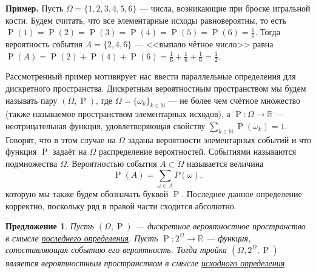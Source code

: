 \documentclass[12pt]{article}
\newtheorem{proposition}[theorem]{Предложение}
\numberwithin{theorem}{section}
\theoremstyle{definition}
\newenvironment{example}{\indent \textbf{Пример.}}{\indent}
\newcommand{\defin}[2]{\hypertarget{#2}{{\color{red} #1}}}
\newcommand{\RR}{\mathbb{R}}
\newcommand{\prob}{\operatorname{P}}
\begin{document}
	\begin{example}
		Пусть $ \Omega = \{1,2,3,4,5,6\} $ --- числа, возникающие при броске игральной кости.
		Будем считать, что все элементарные исходы равновероятны, 
		то есть $ \prob(1) = \prob(2) = \prob(3) = \prob(4) = \prob(5) = \prob(6) = \tfrac{1}{6} $.
		Тогда вероятность события $ A = \{2,4,6\} $ --- <<выпало чётное число>> 
		равна $ \prob(A) = \prob(2) + \prob(4) + \prob(6) = \tfrac{1}{6} + \tfrac{1}{6} + \tfrac{1}{6} = \tfrac{1}{2} $.
	\end{example}
	
	Рассмотренный пример мотивирует нас ввести параллельные определения для дискретного пространства.
	\defin{Дискретным вероятностным пространством}{discr-2} мы будем называть  пару $ (\Omega, \prob) $, 
	где $ \Omega = \{\omega_k\}_{k \in \mathbb{N}} $ --- не более чем счётное множество 
	(также называемое \defin{пространством элементарных исходов}{space-discr}),
	а $ \prob \colon \Omega \to \RR $ --- неотрицательная функция, удовлетворяющая свойству
	$ \sum\limits_{k \in \mathbb{N}} \prob(\omega_k) = 1 $.	
	Говорят, что в этом случае на $ \Omega $ \defin{заданы вероятности элементарных событий}{prob-defined} и что функция $ \prob $ 
	\defin{задаёт на $ \Omega $ распределение вероятностей}{disrtib-discr}.
	\defin{Событиями}{event-discr} называются подмножества $ \Omega $. 
	\defin{Вероятностью события}{prob-discr} $ A \subset \Omega $ называется величина
	$$ \prob(A) = \sum\limits_{\omega \in A} P(\omega), $$
	которую мы также будем обозначать буквой $ \prob $. 
	Последнее данное определение корректно, поскольку ряд в правой части сходится абсолютно.
	
	\begin{proposition} \label{}
		Пусть $ (\Omega, \prob) $ --- дискретное вероятностное пространство в смысле \hyperlink{discr-2}{последнего определения}.
		Пусть $ \prob \colon 2^{\Omega} \to \mathbb{R} $ --- функция, сопоставляющая событию его вероятность.
		Тогда тройка $ (\Omega, 2^{\Omega}, \prob) $ является вероятностным пространством в смысле \hyperlink{prob-space}{исходного определения}.
	\end{proposition}
	
\end{document}
